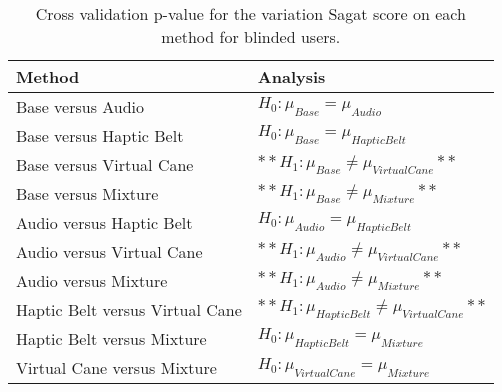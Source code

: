 
\begin{table}[!htb]
\centering
\caption{Cross validation p-value for the variation Sagat score on each method for blinded users.}
\label{tab:lsd_sagat_var}
\begin{tabular}{ll}
\toprule
                         Method &                                        Analysis \\
\midrule
              Base versus Audio &                 $H_{0} : \mu_{Base} = \mu_{Audio}$ \\
        Base versus Haptic Belt &           $H_{0} : \mu_{Base} = \mu_{Haptic Belt}$ \\
       Base versus Virtual Cane &        $**H_{1} : \mu_{Base} \ne \mu_{Virtual Cane}**$ \\
            Base versus Mixture &             $**H_{1} : \mu_{Base} \ne \mu_{Mixture}**$ \\
       Audio versus Haptic Belt &          $H_{0} : \mu_{Audio} = \mu_{Haptic Belt}$ \\
      Audio versus Virtual Cane &       $**H_{1} : \mu_{Audio} \ne \mu_{Virtual Cane}**$ \\
           Audio versus Mixture &            $**H_{1} : \mu_{Audio} \ne \mu_{Mixture}**$ \\
Haptic Belt versus Virtual Cane & $**H_{1} : \mu_{Haptic Belt} \ne \mu_{Virtual Cane}**$ \\
     Haptic Belt versus Mixture &        $H_{0} : \mu_{Haptic Belt} = \mu_{Mixture}$ \\
    Virtual Cane versus Mixture &       $H_{0} : \mu_{Virtual Cane} = \mu_{Mixture}$ \\
\bottomrule
\end{tabular}
\end{table}

